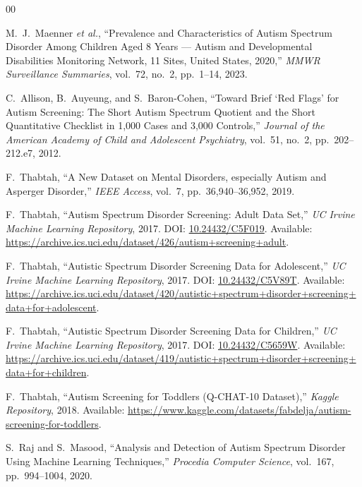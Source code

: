 \documentclass[conference]{IEEEtran}
\begin{document}
\begin{thebibliography}{00}

M.~J.~Maenner \textit{et al.}, ``Prevalence and Characteristics of
Autism Spectrum Disorder Among Children Aged 8 Years --- Autism and
Developmental Disabilities Monitoring Network, 11 Sites, United States,
2020,'' \textit{MMWR Surveillance Summaries}, vol.~72, no.~2,
pp.~1--14, 2023.

C.~Allison, B.~Auyeung, and S.~Baron-Cohen, ``Toward Brief `Red Flags'
for Autism Screening: The Short Autism Spectrum Quotient and the Short
Quantitative Checklist in 1,000 Cases and 3,000 Controls,''
\textit{Journal of the American Academy of Child and Adolescent
Psychiatry}, vol.~51, no.~2, pp.~202--212.e7, 2012.

F.~Thabtah, ``A New Dataset on Mental Disorders, especially Autism and
Asperger Disorder,'' \textit{IEEE Access}, vol.~7,
pp.~36,940--36,952, 2019.

F.~Thabtah, ``Autism Spectrum Disorder Screening: Adult Data Set,''
\textit{UC Irvine Machine Learning Repository}, 2017. DOI:
\href{https://doi.org/10.24432/C5F019}{10.24432/C5F019}. Available:
\url{https://archive.ics.uci.edu/dataset/426/autism+screening+adult}.

F.~Thabtah, ``Autistic Spectrum Disorder Screening Data for Adolescent,''
\textit{UC Irvine Machine Learning Repository}, 2017. DOI:
\href{https://doi.org/10.24432/C5V89T}{10.24432/C5V89T}. Available:
\url{https://archive.ics.uci.edu/dataset/420/autistic+spectrum+disorder+screening+data+for+adolescent}.

F.~Thabtah, ``Autistic Spectrum Disorder Screening Data for Children,''
\textit{UC Irvine Machine Learning Repository}, 2017. DOI:
\href{https://doi.org/10.24432/C5659W}{10.24432/C5659W}. Available:
\url{https://archive.ics.uci.edu/dataset/419/autistic+spectrum+disorder+screening+data+for+children}.

F.~Thabtah, ``Autism Screening for Toddlers (Q-CHAT-10 Dataset),''
\textit{Kaggle Repository}, 2018. Available:
\url{https://www.kaggle.com/datasets/fabdelja/autism-screening-for-toddlers}.

S.~Raj and S.~Masood, ``Analysis and Detection of Autism Spectrum
Disorder Using Machine Learning Techniques,'' \textit{Procedia Computer
Science}, vol.~167, pp.~994--1004, 2020.


\end{thebibliography}
\end{document}
